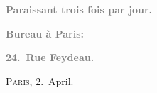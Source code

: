 \pstart
           \begin{otherlanguage}{french}\textcolor{gray}{\textbf{\textbf{Paraissant trois fois par jour.}}}\end{otherlanguage}\pend
           
\pstart
           \begin{otherlanguage}{french}\textcolor{gray}{\textbf{\textbf{Bureau à Paris:}}}\end{otherlanguage}\pend
           
\pstart
           \begin{otherlanguage}{french}\textcolor{gray}{\textbf{\textbf{24. Rue Feydeau.}}}\end{otherlanguage}\hfill \textsc{Paris}, 2. April.\pend
           
